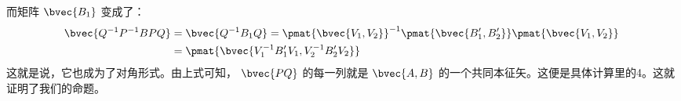 而矩阵 $\bvec{B_1}$ 变成了：
\begin{equation}
\begin{aligned}
\bvec{Q^{-1}P^{-1}BPQ}&=\bvec{Q^{-1}B_1Q}=\pmat{\bvec{V_1,V_2}}^{-1}\pmat{\bvec{B'_1,B'_2}}\pmat{\bvec{V_1,V_2}}\\
&=\pmat{\bvec{V_1^{-1}B'_1V_1,V_2^{-1}B'_2V_2}}\\
\end{aligned}
~
\end{equation}
这就是说，它也成为了对角形式。由上式可知， $\bvec{PQ}$ 的每一列就是 $\bvec{A,B}$ 的一个共同本征矢。这便是具体计算里的4。这就证明了我们的命题。


